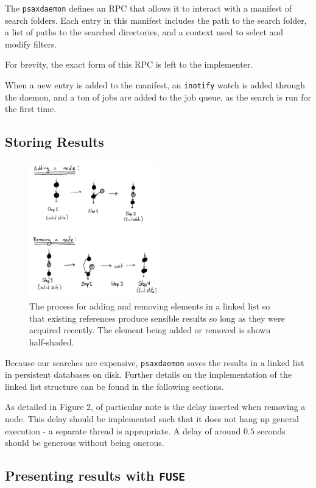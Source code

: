 \documentclass[a4paper]{report}
\newcommand{\inlinecode}{\texttt}
\begin{document}
The \inlinecode{psaxdaemon} defines an RPC that allows it to interact with a manifest of search folders. Each entry in this manifest includes the path to the search folder, a list of paths to the searched directories, and a context used to select and modify filters.

For brevity, the exact form of this RPC is left to the implementer.

When a new entry is added to the manifest, an \inlinecode{inotify} watch is added through the daemon, and a ton of jobs are added to the job queue, as the search is run for the first time.

\subsection{Storing Results}

\begin{figure}[h!]
  \centering
  \includegraphics[width=0.5\textwidth]{addrm}
  \caption{The process for adding and removing elements in a linked list so that existing references produce sensible results so long as they were acquired recently. The element being added or removed is shown half-shaded.}
\end{figure}

Because our searches are expensive, \inlinecode{psaxdaemon} saves the results in a linked list in persistent databases on disk. Further details on the implementation of the linked list structure can be found in the following sections.

As detailed in Figure 2, of particular note is the delay inserted when removing a node. This delay should be implemented such that it does not hang up general execution - a separate thread is appropriate. A delay of around $0.5$ seconds should be generous without being onerous.

\subsection{Presenting results with \inlinecode{FUSE}}
\end{document}
